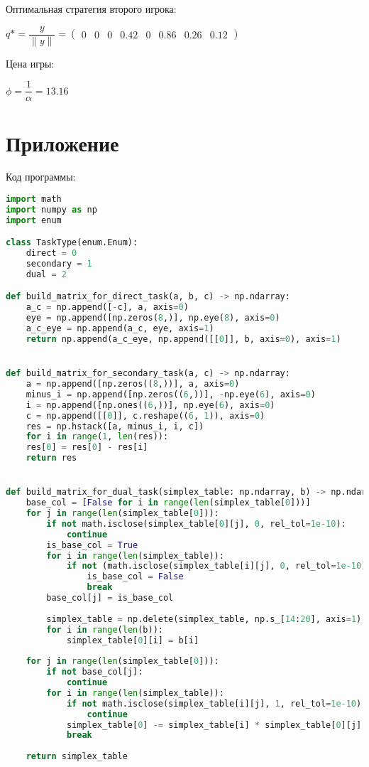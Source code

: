 \documentclass[a4paper, 14pt]{extarticle}
\begin{document}
		Оптимальная стратегия второго игрока:
		
		$q* = \dfrac{y}{\|y\|} = \begin{pmatrix} 0 & 0 & 0 & 0.42 & 0 & 0.86 & 0.26 & 0.12\end{pmatrix}$
		
		Цена игры:
		
		$\phi = \dfrac{1}{\alpha} = 13.16$
		
	\section{Приложение}
	Код программы:		
 	\begin{lstlisting}[language=python]
import math
import numpy as np
import enum

class TaskType(enum.Enum):
	direct = 0
	secondary = 1
	dual = 2

def build_matrix_for_direct_task(a, b, c) -> np.ndarray:
	a_c = np.append([-c], a, axis=0)
	eye = np.append([np.zeros(8,)], np.eye(8), axis=0)
	a_c_eye = np.append(a_c, eye, axis=1)
	return np.append(a_c_eye, np.append([[0]], b, axis=0), axis=1)


def build_matrix_for_secondary_task(a, c) -> np.ndarray:
	a = np.append([np.zeros((8,))], a, axis=0)
	minus_i = np.append([np.zeros((6,))], -np.eye(6), axis=0)
	i = np.append([np.ones((6,))], np.eye(6), axis=0)
	c = np.append([[0]], c.reshape((6, 1)), axis=0)
	res = np.hstack([a, minus_i, i, c])
	for i in range(1, len(res)):
	res[0] = res[0] - res[i]
	return res


def build_matrix_for_dual_task(simplex_table: np.ndarray, b) -> np.ndarray:
	base_col = [False for i in range(len(simplex_table[0]))]
	for j in range(len(simplex_table[0])):
		if not math.isclose(simplex_table[0][j], 0, rel_tol=1e-10):
			continue
		is_base_col = True
		for i in range(len(simplex_table)):
			if not (math.isclose(simplex_table[i][j], 0, rel_tol=1e-10) or math.isclose(simplex_table[i][j], 1, rel_tol=1e-10)):
				is_base_col = False
				break
		base_col[j] = is_base_col
	
		simplex_table = np.delete(simplex_table, np.s_[14:20], axis=1)
		for i in range(len(b)):
			simplex_table[0][i] = b[i]
	
	for j in range(len(simplex_table[0])):
		if not base_col[j]:
			continue
		for i in range(len(simplex_table)):
			if not math.isclose(simplex_table[i][j], 1, rel_tol=1e-10):
				continue
			simplex_table[0] -= simplex_table[i] * simplex_table[0][j]
			break
	
	return simplex_table



\end{lstlisting}
\end{document}
